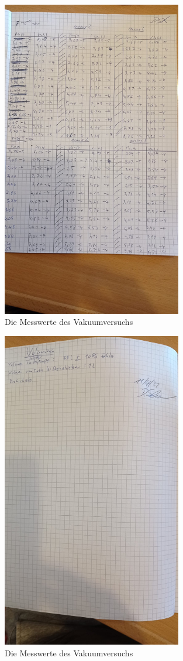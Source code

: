 \begin{figure}[h]
    \centering
    \includegraphics[width=0.7\textwidth]{latex/images/Messwerte_7.jpeg}
    \caption{Die Messwerte des Vakuumversuchs}
\end{figure}

\begin{figure}[h]
    \centering
    \includegraphics[width=0.7\textwidth]{latex/images/Messwerte_8.jpeg}
    \caption{Die Messwerte des Vakuumversuchs}
\end{figure}



